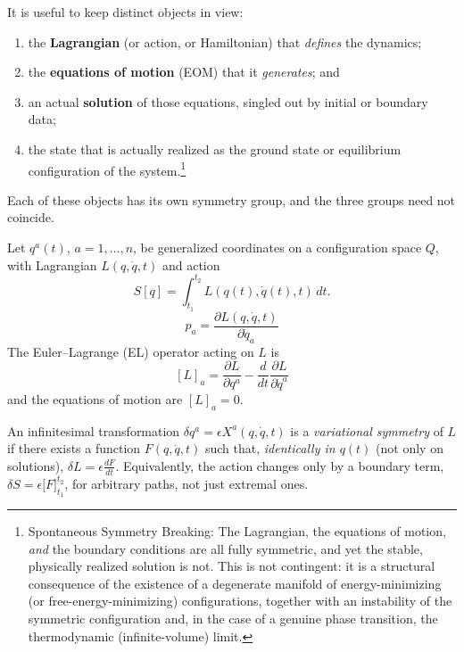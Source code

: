 It is useful to keep distinct objects in view:
\begin{enumerate}
\item the \textbf{Lagrangian} (or action, or Hamiltonian) that \emph{defines} 
    the dynamics;
\item the \textbf{equations of motion} (EOM) that it \emph{generates}; and
\item an actual \textbf{solution} of those equations, singled out by initial
    or boundary data;
\item the state that is actually realized as the ground state or equilibrium 
    configuration of the system.\footnote { Spontaneous Symmetry Breaking: 
        The Lagrangian, the equations of motion,
        \emph{and} the boundary conditions are all fully symmetric, and yet the
        stable, physically realized solution is not. This is not contingent: it
        is a structural consequence of the existence of a degenerate manifold
        of energy-minimizing (or free-energy-minimizing) configurations,
        together with an instability of the symmetric configuration and, in the
        case of a genuine phase transition, the thermodynamic (infinite-volume)
        limit.}

\end{enumerate}
Each of these objects has its own symmetry group, and the three groups need not
coincide. 

Let $q^a(t)$, $a=1,\dots,n$, be generalized coordinates on a 
configuration
space $Q$, with Lagrangian $L(q,\dot q,t)$ and action
\[
S[q] = \int_{t_1}^{t_2} L(q(t),\dot q(t),t)\,dt .
\]
\begin{equation*}
   p_a=\frac{ \partial L(q,\dot q,t)}{\partial \dot q_a}
\end{equation*}
The Euler--Lagrange (EL) operator acting on $L$ is
\[
[L]_a = \frac{\partial L}{\partial q^a} - 
\frac{d}{dt}\frac{\partial L}{\partial \dot q^a}
\]
and the equations of motion are $[L]_a=0$.

\begin{definition}
An infinitesimal transformation $\delta q^a = \epsilon X^a(q,\dot q,t)$ is a
    \emph{variational symmetry} of $L$ if there exists a function $F(q,\dot
    q,t)$ such that, \emph{identically in $q(t)$} (not only on solutions),
    $\delta L=\epsilon \tfrac{dF}{dt}$. Equivalently, the action changes only by
    a boundary term, $\delta S = \epsilon\big[F\big]_{t_1}^{t_2}$, for
    arbitrary paths, not just extremal ones.
\end{definition}

